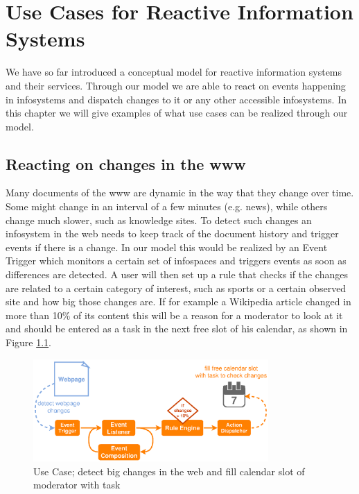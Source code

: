 

\chapter{Use Cases for Reactive Information Systems}
We have so far introduced a conceptual model for reactive information systems and their services.
Through our model we are able to react on events happening in \textrm{\glspl{infosystem}} and dispatch changes to it or any other accessible \textrm{\glspl{infosystem}}.
In this chapter we will give examples of what use cases can be realized through our model.

\section{Reacting on changes in the \gls{www}}
Many documents of the \textrm{\gls{www}} are dynamic in the way that they change over time.
Some might change in an interval of a few minutes (e.g. news), while others change much slower, such as knowledge sites.
To detect such changes an \textrm{\gls{infosystem}} in the \textrm{\gls{web}} needs to keep track of the document history and trigger events if there is a change.
In our model this would be realized by an \textrm{Event Trigger} which monitors a certain set of \textrm{\glspl{infospace}} and triggers events as soon as differences are detected.
A user will then set up a rule that checks if the changes are related to a certain category of interest, such as sports or a certain observed site and how big those changes are.
If for example a Wikipedia article changed in more than 10\% of its content this will be a reason for a moderator to look at it and should be entered as a task in the next free slot of his calendar, as shown in Figure \ref{fig:DetectChangesInTheWeb}.
\begin{figure}[!ht]
  \centering
  \includegraphics[width=0.8\textwidth]{figures/DetectChangesInTheWeb}
  \caption{Use Case; detect big changes in the \textrm{\gls{web}} and fill calendar slot of moderator with task}
  \label{fig:DetectChangesInTheWeb}
\end{figure}




